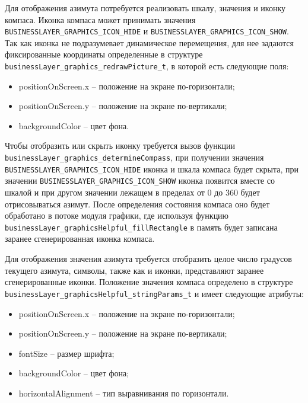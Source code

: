 Для отображения азимута потребуется реализовать шкалу, значения и иконку компаса. Иконка компаса может принимать значения \lstinline{BUSINESSLAYER_GRAPHICS_ICON_HIDE} и \lstinline{BUSINESSLAYER_GRAPHICS_ICON_SHOW}.
Так как иконка не подразумевает динамическое перемещения, для нее задаются фиксированные координаты определенные в структуре \lstinline{businessLayer_graphics_redrawPicture_t}, в которой есть следующие поля:

\begin{itemize}
    \item positionOnScreen.x -- положение на экране по-горизонтали;
    \item positionOnScreen.y -- положение на экране по-вертикали;
    \item backgroundColor -- цвет фона.
\end{itemize}

Чтобы отобразить или скрыть иконку требуется вызов функции \lstinline{businessLayer_graphics_determineCompass}, при получении значения \lstinline{BUSINESSLAYER_GRAPHICS_ICON_HIDE} иконка и шкала компаса
будет скрыта, при значении \lstinline{BUSINESSLAYER_GRAPHICS_ICON_SHOW} иконка появится вместе со шкалой и при другом значении лежащем в пределах от 0 до 360 будет отрисовываться азимут.
После определения состояния компаса оно будет обработано в потоке модуля графики, где используя функцию \lstinline{businessLayer_graphicsHelpful_fillRectangle} в память будет записана заранее сгенерированная иконка компаса.

Для отображения значения азимута требуется отобразить целое число градусов текущего азимута, символы, также как и иконки, представляют заранее сгенерированные иконки. Положение
значения компаса определено в структуре \lstinline{businessLayer_graphicsHelpful_stringParams_t} и имеет следующие атрибуты:

\begin{itemize}
    \item positionOnScreen.x -- положение на экране по-горизонтали;
    \item positionOnScreen.y -- положение на экране по-вертикали;
    \item fontSize -- размер шрифта;
    \item backgroundColor -- цвет фона;
    \item horizontalAlignment -- тип выравнивания по горизонтали.
\end{itemize}

